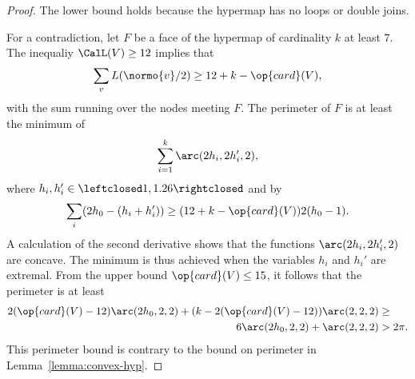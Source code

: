 \begin{proof} The lower bound holds because the hypermap has no loops
  or double joins.  

For a contradiction, let $F$ be a face of the
  hypermap of cardinality $k$ at least $7$.  The inequaliy $\CalL(V)\ge 12$
implies that
\begin{equation}\label{eqn:L7}
\sum_{v} L(\normo{v}/2) \ge 12+k-\op{card}(V),
\end{equation}
with the sum running over the nodes meeting $F$.
The perimeter of $F$ is at least the minimum of
\[
\sum_{i=1}^k \arc(2h_i,2h_i',2),
\]
where $h_i,h_i'\in \leftclosed 1,1.26\rightclosed$ and by 
\[
\sum_{i} (2h_0 - (h_i+h_i')) \ge (12+k - \op{card}(V)) 2 (h_0-1).
\]
A calculation of the second derivative shows that the functions $\arc(2h_i,2h_i',2)$ are concave.
The minimum is thus achieved when the variables $h_i$ and $h_i'$ are extremal.  From
the upper bound $\op{card}(V)\le 15$, it follows that the perimeter
is at least
\begin{align*}
2 (\op{card}(V) -12) \arc(2h_0,2,2) + (k - 2(\op{card}(V)-12)) \arc(2,2,2) &\ge\\
6 \arc(2h_0,2,2) + \arc(2,2,2) &> 2\pi.
\end{align*}
This perimeter bound is contrary to the bound on
perimeter in Lemma~\ref{lemma:convex-hyp}.
\end{proof}


%
%





